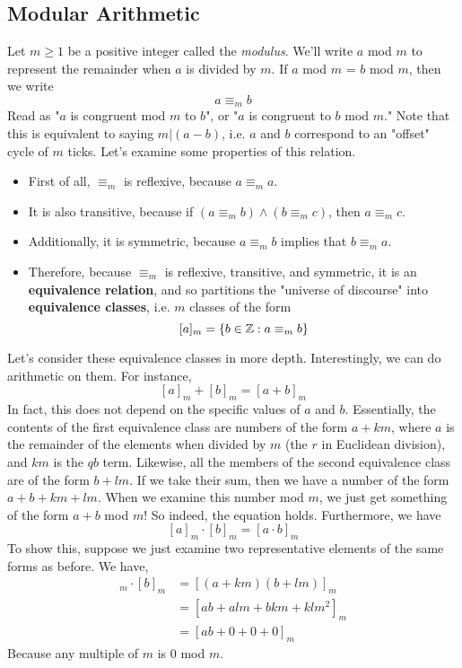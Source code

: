 \documentclass[10pt]{article}
\newcommand\ZZ{{\mathbb Z}}
\theoremstyle{definition}
\begin{document}
\subsection{Modular Arithmetic}
Let $m\geq 1$ be a positive integer called the \textit{modulus}.  We'll write $a$ mod $m$ to represent the remainder when $a$ is divided by $m$. If $a$ mod $m$ = $b$ mod $m$, then we write 
\[a\equiv_m b\]
Read as "$a$ is congruent mod $m$ to $b$", or "$a$ is congruent to $b$ mod $m$."  Note that this is equivalent to saying $m|(a-b)$, i.e. $a$ and $b$ correspond to an "offset" cycle of $m$ ticks.  Let's examine some properties of this relation. 
\begin{itemize}
\item First of all, $\equiv_m$ is reflexive, because $a\equiv_m a$.
\item It is also transitive, because if $(a\equiv_m b) \land (b\equiv_m c)$, then $a\equiv_m c$. 
\item Additionally, it is symmetric, because $a\equiv_m b$ implies that $b\equiv_m a$.  
\item Therefore, because $\equiv_m$ is reflexive, transitive, and symmetric, it is an \textbf{equivalence relation}, and so partitions the "universe of discourse" into \textbf{equivalence classes}, i.e. $m$ classes of the form 
\[ [a]_m = \set{b\in\ZZ: a\equiv_m b} \]
\end{itemize}
Let's consider these equivalence classes in more depth.  Interestingly, we can do arithmetic on them.  For instance, 
\[ [a]_m + [b]_m = [a+b]_m \]
In fact, this does not depend on the specific values of $a$ and $b$.  Essentially, the contents of the first equivalence class are numbers of the form $a + km$, where $a$ is the remainder of the elements when divided by $m$ (the $r$ in Euclidean division), and $km$ is the $qb$ term.  Likewise, all the members of the second equivalence class are of the form $b+lm$.  If we take their sum, then we have a number of the form $a+b + km+lm$.  When we examine this number mod $m$, we just get something of the form $a+b$ mod $m$!  So indeed, the equation holds.  Furthermore, we have 
\[[a]_m \cdot [b]_m = [a\cdot b]_m\] 
To show this, suppose we just examine two representative elements of the same forms as before.  We have, 
\begin{align*}
[a]_m \cdot [b]_m &= [(a+km)(b+lm)]_m \\ 
&= [ab + alm + bkm + klm^2]_m \\ 
&= [ab+0+0+0]_m
\end{align*}
Because any multiple of $m$ is $0$ mod $m$.  
\end{document}
